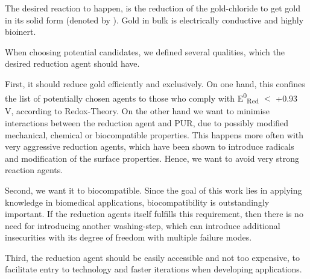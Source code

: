 The desired reaction to happen, is the reduction of the gold-chloride to get gold in its solid form (denoted by ). Gold in bulk is electrically conductive and highly bioinert.

When choosing potential candidates, we defined several qualities, which the desired reduction agent should have.

First, it should reduce gold efficiently and exclusively. On one hand, this confines the list of potentially chosen agents to those who comply with E\textsuperscript{0}\textsubscript{Red} $\mathrm{<}$ +0.93 V, according to Redox-Theory. On the other hand we want to minimise interactions between the reduction agent and PUR, due to possibly modified mechanical, chemical or biocompatible properties. This happens more often with very aggressive reduction agents, which have been shown to introduce radicals and modification of the surface properties. Hence, we want to avoid very strong reaction agents. 

Second, we want it to biocompatible. Since the goal of this work lies in applying knowledge in biomedical applications, biocompatibility is outstandingly important. If the reduction agents itself fulfills this requirement, then there is no need for introducing another washing-step, which can introduce additional insecurities with its degree of freedom with multiple failure modes.


Third, the reduction agent should be easily accessible and not too expensive, to facilitate entry to technology and faster iterations when developing applications.


